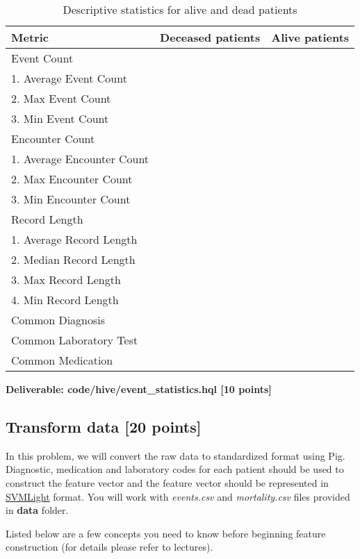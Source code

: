 \documentclass[12pt]{article}
\begin{document}
\begin{table}[th]
\centering
\begin{tabular}{@{}l|l|l}
\toprule
Metric & Deceased patients & Alive patients  \\ \hline
Event Count & &  \\ 
1. Average Event Count && \\
2. Max Event Count  &&\\
3. Min Event Count  &&\\ \hline

Encounter Count & &  \\ 
1. Average Encounter Count  &&\\
2. Max Encounter Count  &&\\
3. Min Encounter Count  &&\\ \hline

Record Length & &  \\ 
1. Average Record Length &&\\
2. Median Record Length &&\\
3. Max Record Length&& \\
4. Min Record Length&& \\ \hline

Common Diagnosis & &  \\ \hline

Common Laboratory Test & &  \\ \hline

Common Medication & &  \\ 
\bottomrule
\end{tabular}
\caption{Descriptive statistics for alive and dead patients\label{tbl:stat}}
\end{table} 

\textbf{Deliverable: code/hive/event\_statistics.hql [10 points]}

\subsection{Transform data [20 points]}
In this problem, we will convert the raw data to standardized format using Pig. Diagnostic, medication and laboratory codes for each patient should be used to construct the feature vector and the feature vector should be represented in \href{http://svmlight.joachims.org/}{SVMLight} format. You will work with \textit{events.csv} and \textit{mortality.csv} files provided in \textbf{data} folder. 

Listed below are a few concepts you need to know before beginning feature construction (for details please refer to lectures). 
\end{document}
